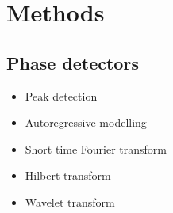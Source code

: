 \documentclass{article}
\begin{document}
\section*{Methods}

\subsection*{Phase detectors}
\begin{itemize}
\item Peak detection
\item Autoregressive modelling
\item Short time Fourier transform
\item Hilbert transform
\item Wavelet transform
\end{itemize}
\end{document}
